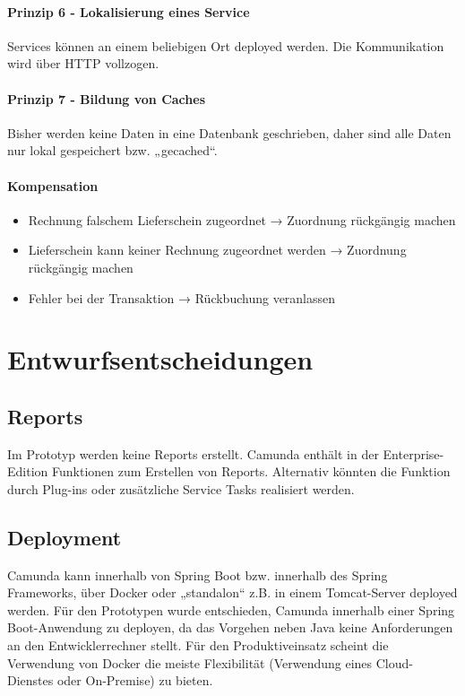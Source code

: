 \paragraph{Prinzip 6 - Lokalisierung eines Service} Services können an einem beliebigen Ort deployed werden. Die Kommunikation wird über HTTP vollzogen.

\paragraph{Prinzip 7 - Bildung von Caches} Bisher werden keine Daten in eine Datenbank geschrieben, daher sind alle Daten nur lokal gespeichert bzw. „gecached“.

\paragraph{Kompensation}
\begin{itemize}
\item Rechnung falschem Lieferschein zugeordnet → Zuordnung rückgängig machen
\item Lieferschein kann keiner Rechnung zugeordnet werden → Zuordnung rückgängig machen
\item Fehler bei der Transaktion → Rückbuchung veranlassen
\end{itemize}

\section{Entwurfsentscheidungen}\label{section-design-decisions}

\subsection{Reports}

Im Prototyp werden keine Reports erstellt. Camunda enthält in der Enterprise-Edition Funktionen zum Erstellen von Reports. Alternativ könnten die Funktion durch Plug-ins oder zusätzliche Service Tasks realisiert werden.

\subsection{Deployment}

Camunda kann innerhalb von Spring Boot bzw. innerhalb des Spring Frameworks, über Docker oder „standalon“ z.B. in einem Tomcat-Server deployed werden. Für den Prototypen wurde entschieden, Camunda innerhalb einer Spring Boot-Anwendung zu deployen, da das Vorgehen neben Java keine Anforderungen an den Entwicklerrechner stellt. Für den Produktiveinsatz scheint die Verwendung von Docker die meiste Flexibilität (Verwendung eines Cloud-Dienstes oder On-Premise) zu bieten.

